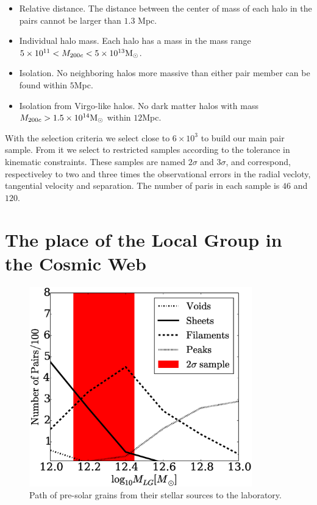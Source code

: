 \documentclass{iau}
\newcommand{\Msun}{{\ifmmode{{\rm {M_{\odot}}}}\else{${\rm{M_{\odot}}}$}\fi}}
\begin{document}
\begin{itemize}
\item Relative distance. The distance between the center of mass of
  each halo in the pairs cannot be larger than $1.3$ Mpc.
\item Individual halo mass. Each halo has a mass in the mass range
  $5\times 10^{11}<M_{200c}<5\times 10^{13}\Msun$.  
\item  Isolation. No neighboring halos more massive than either pair
member can be found within $5$Mpc.
\item Isolation from Virgo-like halos. No dark matter halos with mass
  $M_{200c}>1.5\times 10^{14}\Msun$ within $12$Mpc.
\end{itemize}

With the selection criteria we select close to $6\times 10^3$ to build
our main pair sample. From it we select to restricted samples
according to the tolerance in kinematic constraints. These samples 
are named $2\sigma$ and $3\sigma$, and correspond, respectiveley to
two and three times the observational errors in the radial vecloty,
tangential velocity and separation. The number of paris in each sample
is $46$ and $120$. 


\section{The place of the Local Group in the Cosmic Web}

\begin{figure}[b]
\begin{center}
 \includegraphics[width=3.8in]{histogram_mass_distro.eps} 
 \caption{Path of pre-solar grains from their stellar sources to the laboratory.}
   \label{fig1}
\end{center}
\end{figure}
\end{document}

